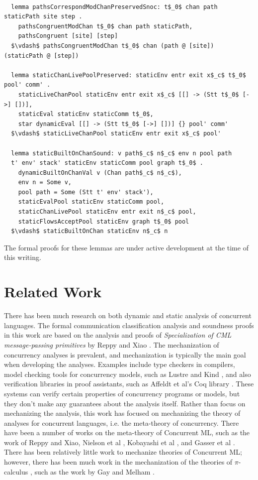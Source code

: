 \documentclass[letterpaper, 11pt]{report}
\begin{document}
\begin{lstlisting}[language=logic, mathescape]

  lemma pathsCorrespondModChanPreservedSnoc: t$_0$ chan path staticPath site step .
    pathsCongruentModChan t$_0$ chan path staticPath,
    pathsCongruent [site] [step]
  $\vdash$ pathsCongruentModChan t$_0$ chan (path @ [site]) (staticPath @ [step])

  lemma staticChanLivePoolPreserved: staticEnv entr exit x$_c$ t$_0$ pool' comm' . 
    staticLiveChanPool staticEnv entr exit x$_c$ [[] -> (Stt t$_0$ [->] [])],
    staticEval staticEnv staticComm t$_0$,
    star dynamicEval [[] -> (Stt t$_0$ [->] [])] {} pool' comm'
  $\vdash$ staticLiveChanPool staticEnv entr exit x$_c$ pool'

  lemma staticBuiltOnChanSound: v path$_c$ n$_c$ env n pool path
  t' env' stack' staticEnv staticComm pool graph t$_0$ . 
    dynamicBuiltOnChanVal v (Chan path$_c$ n$_c$),
    env n = Some v,
    pool path = Some (Stt t' env' stack'),
    staticEvalPool staticEnv staticComm pool,
    staticChanLivePool staticEnv entr exit n$_c$ pool,
    staticFlowsAcceptPool staticEnv graph t$_0$ pool
  $\vdash$ staticBuiltOnChan staticEnv n$_c$ n

\end{lstlisting}

The formal proofs for these lemmas are under active development at the time of this writing.

\section{Related Work}
There has been much research on both dynamic and static analysis of concurrent languages. 
The formal communication classification analysis and soundness proofs in this work are
based on the analysis and proofs of \textit{Specialization of CML message-passing primitives}
by Reppy and Xiao \cite{reppy2007specialization}.
The mechanization of concurrency analyses is prevalent, and mechanization is typically the main
goal when developing the analyses. Examples include type checkers in compilers,
model checking tools for concurrency models, such as Lustre \cite{halbwachs1991synchronous} and Kind \cite{kind},
and also verification libraries in proof assistants, such as Affeldt et al's Coq library \cite{affeldt2008coq}.
These systems can verify certain properties of concurrency programs or models, but they don't
make any guarantees about the analysis itself.
Rather than focus on mechanizing the analysis, this work has focused on
mechanizing the theory of analyses for concurrent languages, i.e. the meta-theory of concurrency.
There have been a number of works on the meta-theory of Concurrent ML,
such as the work of Reppy and Xiao, Nielson et al \cite{nielson1994higher}, Kobayashi et al \cite{kobayashi1995static}, and Gasser et al \cite{gasser1997systematic}.
There has been relatively little work to mechanize theories of Concurrent ML; however,
there has been much work in the mechanization of the theories of $\pi$-calculus
\cite{milner1999communicating}, such as the work by Gay \cite{gay2001framework} and Melham \cite{melham1994mechanized}. 
\end{document}
